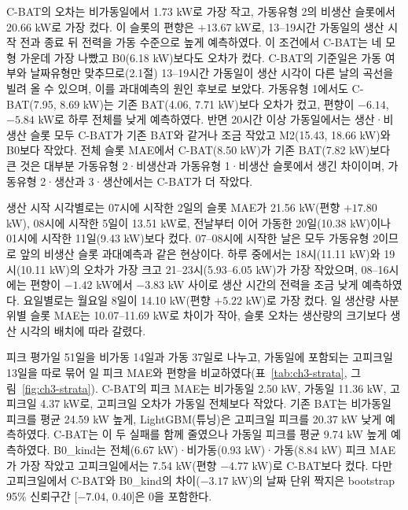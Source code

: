 C-BAT의 오차는 비가동일에서 1.73 kW로 가장 작고, 가동유형 2의 비생산 슬롯에서 20.66 kW로 가장 컸다. 이 슬롯의 편향은 $+13.67$ kW로, 13--19시간 가동일의 생산 시작 전과 종료 뒤 전력을 가동 수준으로 높게 예측하였다. 이 조건에서 C-BAT는 네 모형 가운데 가장 나빴고 B0(6.18 kW)보다도 오차가 컸다. C-BAT의 기준일은 가동 여부와 날짜유형만 맞추므로(2.1절) 13--19시간 가동일이 생산 시각이 다른 날의 곡선을 빌려 올 수 있으며, 이를 과대예측의 원인 후보로 보았다. 가동유형 1에서도 C-BAT(7.95, 8.69 kW)는 기존 BAT(4.06, 7.71 kW)보다 오차가 컸고, 편향이 $-6.14$, $-5.84$ kW로 하루 전체를 낮게 예측하였다. 반면 20시간 이상 가동일에서는 생산·비생산 슬롯 모두 C-BAT가 기존 BAT와 같거나 조금 작았고 M2(15.43, 18.66 kW)와 B0보다 작았다. 전체 슬롯 MAE에서 C-BAT(8.50 kW)가 기존 BAT(7.82 kW)보다 큰 것은 대부분 가동유형 2·비생산과 가동유형 1·비생산 슬롯에서 생긴 차이이며, 가동유형 2·생산과 3·생산에서는 C-BAT가 더 작았다.

생산 시작 시각별로는 07시에 시작한 2일의 슬롯 MAE가 21.56 kW(편향 $+17.80$ kW), 08시에 시작한 5일이 13.51 kW로, 전날부터 이어 가동한 20일(10.38 kW)이나 01시에 시작한 11일(9.43 kW)보다 컸다. 07--08시에 시작한 날은 모두 가동유형 2이므로 앞의 비생산 슬롯 과대예측과 같은 현상이다. 하루 중에서는 18시(11.11 kW)와 19시(10.11 kW)의 오차가 가장 크고 21--23시(5.93--6.05 kW)가 가장 작았으며, 08--16시에는 편향이 $-1.42$ kW에서 $-3.83$ kW 사이로 생산 시간의 전력을 조금 낮게 예측하였다. 요일별로는 월요일 8일이 14.10 kW(편향 $+5.22$ kW)로 가장 컸다. 일 생산량 사분위별 슬롯 MAE는 10.07--11.69 kW로 차이가 작아, 슬롯 오차는 생산량의 크기보다 생산 시각의 배치에 따라 갈렸다.


피크 평가일 51일을 비가동 14일과 가동 37일로 나누고, 가동일에 포함되는 고피크일 13일을 따로 묶어 일 피크 MAE와 편향을 비교하였다(표~\ref{tab:ch3-strata}, 그림~\ref{fig:ch3-strata}). C-BAT의 피크 MAE는 비가동일 2.50 kW, 가동일 11.36 kW, 고피크일 4.37 kW로, 고피크일 오차가 가동일 전체보다 작았다. 기존 BAT는 비가동일 피크를 평균 24.59 kW 높게, LightGBM(튜닝)은 고피크일 피크를 20.37 kW 낮게 예측하였다. C-BAT는 이 두 실패를 함께 줄였으나 가동일 피크를 평균 9.74 kW 높게 예측하였다. B0\_kind는 전체(6.67 kW)·비가동(0.93 kW)·가동(8.84 kW) 피크 MAE가 가장 작았고 고피크일에서는 7.54 kW(편향 $-4.77$ kW)로 C-BAT보다 컸다. 다만 고피크일에서 C-BAT와 B0\_kind의 차이($-3.17$ kW)의 날짜 단위 짝지은 bootstrap 95\% 신뢰구간 [$-7.04$, 0.40]은 0을 포함한다.

